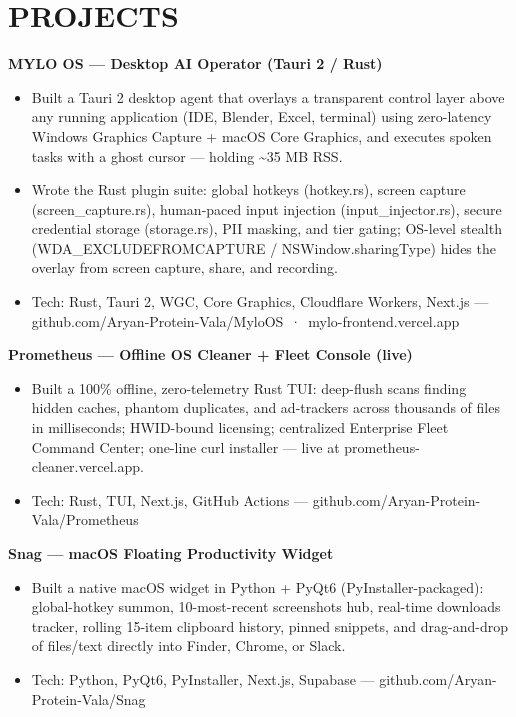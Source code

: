 \documentclass[9pt]{article}
\begin{document}
\section*{PROJECTS}
\textbf{MYLO OS  ---  Desktop AI Operator (Tauri 2 / Rust)}
\vspace{1pt}
\begin{itemize}[leftmargin=11pt,itemsep=0pt,topsep=1pt,parsep=0pt]
\item Built a Tauri 2 desktop agent that overlays a transparent control layer above any running application (IDE, Blender, Excel, terminal) using zero-latency Windows Graphics Capture + macOS Core Graphics, and executes spoken tasks with a ghost cursor  ---  holding \textasciitilde{}35 MB RSS.
\item Wrote the Rust plugin suite: global hotkeys (hotkey.rs), screen capture (screen\_capture.rs), human-paced input injection (input\_injector.rs), secure credential storage (storage.rs), PII masking, and tier gating; OS-level stealth (WDA\_EXCLUDEFROMCAPTURE / NSWindow.sharingType) hides the overlay from screen capture, share, and recording.
\item Tech: Rust, Tauri 2, WGC, Core Graphics, Cloudflare Workers, Next.js  ---  github.com/Aryan-Protein-Vala/MyloOS \,·\, mylo-frontend.vercel.app
\end{itemize}
\textbf{Prometheus  ---  Offline OS Cleaner + Fleet Console (live)}
\vspace{1pt}
\begin{itemize}[leftmargin=11pt,itemsep=0pt,topsep=1pt,parsep=0pt]
\item Built a 100\% offline, zero-telemetry Rust TUI: deep-flush scans finding hidden caches, phantom duplicates, and ad-trackers across thousands of files in milliseconds; HWID-bound licensing; centralized Enterprise Fleet Command Center; one-line curl installer  ---  live at prometheus-cleaner.vercel.app.
\item Tech: Rust, TUI, Next.js, GitHub Actions  ---  github.com/Aryan-Protein-Vala/Prometheus
\end{itemize}
\textbf{Snag  ---  macOS Floating Productivity Widget}
\vspace{1pt}
\begin{itemize}[leftmargin=11pt,itemsep=0pt,topsep=1pt,parsep=0pt]
\item Built a native macOS widget in Python + PyQt6 (PyInstaller-packaged): global-hotkey summon, 10-most-recent screenshots hub, real-time downloads tracker, rolling 15-item clipboard history, pinned snippets, and drag-and-drop of files/text directly into Finder, Chrome, or Slack.
\item Tech: Python, PyQt6, PyInstaller, Next.js, Supabase  ---  github.com/Aryan-Protein-Vala/Snag
\end{itemize}
\end{document}
